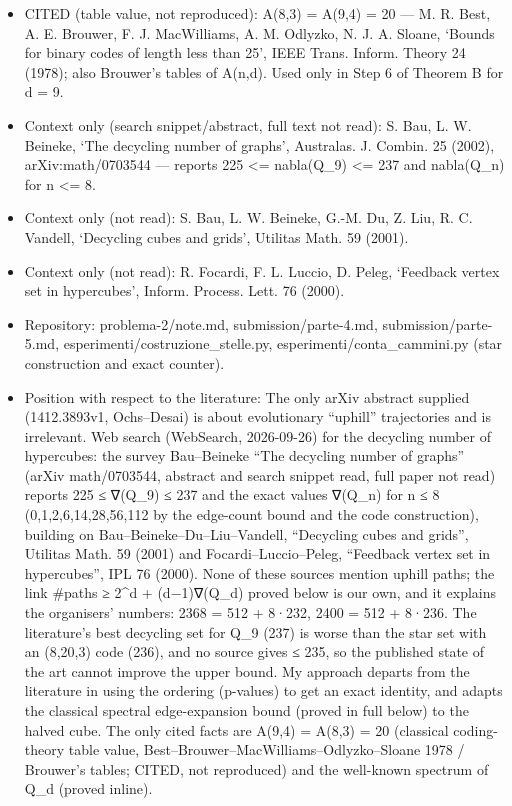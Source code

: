 \begin{itemize}
\tightlist
\item
  CITED (table value, not reproduced): A(8,3) = A(9,4) = 20 --- M. R.
  Best, A. E. Brouwer, F. J. MacWilliams, A. M. Odlyzko, N. J. A.
  Sloane, `Bounds for binary codes of length less than 25', IEEE Trans.
  Inform. Theory 24 (1978); also Brouwer's tables of A(n,d). Used only
  in Step 6 of Theorem B for d = 9.
\item
  Context only (search snippet/abstract, full text not read): S. Bau, L.
  W. Beineke, `The decycling number of graphs', Australas. J. Combin. 25
  (2002), arXiv:math/0703544 --- reports 225 \textless= nabla(Q\_9)
  \textless= 237 and nabla(Q\_n) for n \textless= 8.
\item
  Context only (not read): S. Bau, L. W. Beineke, G.-M. Du, Z. Liu, R.
  C. Vandell, `Decycling cubes and grids', Utilitas Math. 59 (2001).
\item
  Context only (not read): R. Focardi, F. L. Luccio, D. Peleg, `Feedback
  vertex set in hypercubes', Inform. Process. Lett. 76 (2000).
\item
  Repository: problema-2/note.md, submission/parte-4.md,
  submission/parte-5.md, esperimenti/costruzione\_stelle.py,
  esperimenti/conta\_cammini.py (star construction and exact counter).
\item
  Position with respect to the literature: The only arXiv abstract
  supplied (1412.3893v1, Ochs--Desai) is about evolutionary ``uphill''
  trajectories and is irrelevant. Web search (WebSearch, 2026-09-26) for
  the decycling number of hypercubes: the survey Bau--Beineke ``The
  decycling number of graphs'' (arXiv math/0703544, abstract and search
  snippet read, full paper not read) reports 225 ≤ ∇(Q\_9) ≤ 237 and the
  exact values ∇(Q\_n) for n ≤ 8 (0,1,2,6,14,28,56,112 by the edge-count
  bound and the code construction), building on
  Bau--Beineke--Du--Liu--Vandell, ``Decycling cubes and grids'',
  Utilitas Math. 59 (2001) and Focardi--Luccio--Peleg, ``Feedback vertex
  set in hypercubes'', IPL 76 (2000). None of these sources mention
  uphill paths; the link \#paths ≥ 2\^{}d + (d−1)∇(Q\_d) proved below is
  our own, and it explains the organisers' numbers: 2368 = 512 + 8·232,
  2400 = 512 + 8·236. The literature's best decycling set for Q\_9 (237)
  is worse than the star set with an (8,20,3) code (236), and no source
  gives ≤ 235, so the published state of the art cannot improve the
  upper bound. My approach departs from the literature in using the
  ordering (p-values) to get an exact identity, and adapts the classical
  spectral edge-expansion bound (proved in full below) to the halved
  cube. The only cited facts are A(9,4) = A(8,3) = 20 (classical
  coding-theory table value, Best--Brouwer--MacWilliams--Odlyzko--Sloane
  1978 / Brouwer's tables; CITED, not reproduced) and the well-known
  spectrum of Q\_d (proved inline).
\end{itemize}


